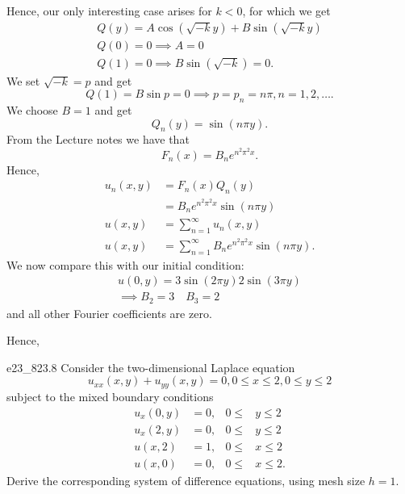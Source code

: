 \begin{derivation}
  Hence, our only interesting case arises for $k < 0$, for which we get
  \begin{gather*}
    Q(y) = A \cos \left( \sqrt{-k} y \right) + B \sin \left( \sqrt{-k}y \right) \\
    Q(0) = 0 \implies A = 0 \\
    Q(1) = 0 \implies B \sin \left( \sqrt{-k} \right)  = 0
  .\end{gather*}
  We set $\sqrt{-k} = p$ and get
  \begin{equation*}
    Q(1) = B \sin p = 0 \implies p = p_n = n \pi, n = 1,2,\ldots 
  .\end{equation*}
  We choose $B = 1$ and get
  \begin{equation*}
    Q_n(y) = \sin (n \pi y)
  .\end{equation*}
  From the Lecture notes we have that
  \begin{equation*}
    F_n(x) = B_n e^{n^2 \pi^2 x}
  .\end{equation*}
  Hence,
  \begin{align*}
    u_n (x,y) &= F_n(x) Q_n(y) \\
    &= B_n e^{n^2 \pi^2 x} \sin (n \pi y) \\
    u(x,y) &= \sum_{n = 1}^{\infty} u_n(x,y) \\
    u(x,y) &= \sum_{n = 1}^{\infty} B_n e^{n^2 \pi^2 x} \sin (n \pi y)
  .\end{align*}
  We now compare this with our initial condition:
  \begin{gather*}
    u(0,y) = 3 \sin (2\pi y) 2 \sin (3\pi y) \\
    \implies B_2 = 3 \quad B_3 = 2
  \end{gather*}
  and all other Fourier coefficients are zero.

  Hence,
\end{derivation}


\begin{problemwithimage}{e23_8}{23.8}
  Consider the two-dimensional Laplace equation
  \begin{equation*}
    u_{x x}(x,y) + u_{yy}(x,y) = 0, 0 \leq x \leq 2, 0 \leq y \leq 2
  \end{equation*}
  subject to the mixed boundary conditions
  \begin{align*}
    u_x(0,y) &= 0, & 0 \leq &y \leq 2 \\
    u_x(2,y) &= 0, & 0 \leq &y \leq 2 \\
    u(x,2) &= 1, & 0 \leq &x \leq 2 \\
    u(x,0) &= 0, & 0 \leq &x \leq 2
  .\end{align*}
  Derive the corresponding system of difference equations, using mesh size $h = 1$.
\end{problemwithimage}

